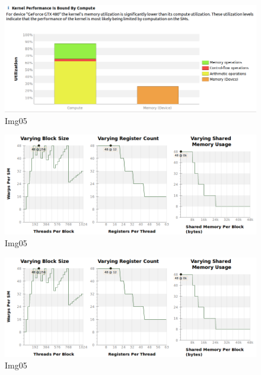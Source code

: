 \documentclass[a4paper]{article}
\begin{document}
\begin{figure}[ht]
    \centering
    \includegraphics[width=0.7\linewidth]{profiling/darker/darker_utilization_00}
    \caption{Img05}
    \label{fig:du}
\end{figure}
\FloatBarrier

\begin{figure}[ht]
    \centering
    \includegraphics[width=0.7\linewidth]{profiling/darker/darker_varying}
    \caption{Img05}
    \label{fig:dv}
\end{figure}
\FloatBarrier



\begin{figure}[ht]
    \centering
    \includegraphics[width=0.7\linewidth]{profiling/darker/darker_varying}
    \caption{Img05}
    \label{fig:histo}
\end{figure}
\FloatBarrier

\printbibliography 
\end{document}
